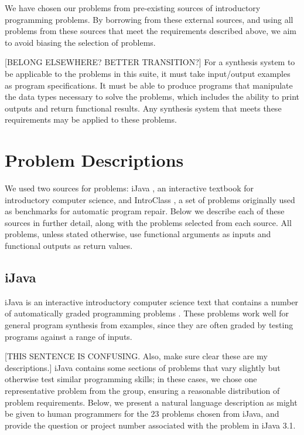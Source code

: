 \documentclass{sig-alternate}
\begin{document}
We have chosen our problems from pre-existing sources of introductory programming problems. By borrowing from these external sources, and using all problems from these sources that meet the requirements described above, we aim to avoid biasing the selection of problems.

[BELONG ELSEWHERE? BETTER TRANSITION?] For a synthesis system to be applicable to the problems in this suite, it must take input/output examples as program specifications. It must be able to produce programs that manipulate the data types necessary to solve the problems, which includes the ability to print outputs and return functional results. Any synthesis system that meets these requirements may be applied to these problems.


\section{Problem Descriptions} \label{descriptionsSection}

We used two sources for problems: iJava \cite{iJava}, an interactive textbook for introductory computer science, and IntroClass \cite{ManyBugsAndIntroClass, Brun13TRgptest}, a set of problems originally used as benchmarks for automatic program repair. Below we describe each of these sources in further detail, along with the problems selected from each source. All problems, unless stated otherwise, use functional arguments as inputs and functional outputs as return values.

\subsection{iJava}


iJava is an interactive introductory computer science text that contains a number of automatically graded programming problems \cite{iJava, Moll:2011:IOI:1968521.1968535}. These problems work well for general program synthesis from examples, since they are often graded by testing programs against a range of inputs.

[THIS SENTENCE IS CONFUSING. Also, make sure clear these are my descriptions.] iJava contains some sections of problems that vary slightly but otherwise test similar programming skills; in these cases, we chose one representative problem from the group, ensuring a reasonable distribution of problem requirements. Below, we present a natural language description as might be given to human programmers for the 23 problems chosen from iJava, and provide the question or project number associated with the problem in iJava 3.1.
\end{document}
